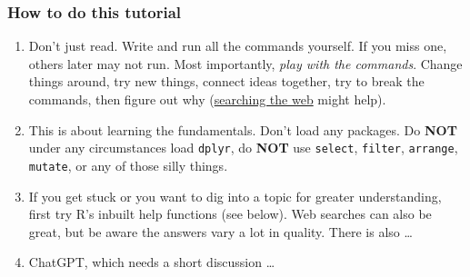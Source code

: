 \documentclass[
]{article}
\providecommand{\tightlist}{%
  \setlength{\itemsep}{0pt}\setlength{\parskip}{0pt}}
\begin{document}
\subsubsection{How to do this tutorial}\label{how-to-do-this-tutorial}

\begin{enumerate}
\def\labelenumi{\arabic{enumi})}
\tightlist
\item
  Don't just read. Write and run all the commands yourself. If you miss
  one, others later may not run. Most importantly, \emph{play with the
  commands}. Change things around, try new things, connect ideas
  together, try to break the commands, then figure out why
  (\href{www.duckduckgo.com}{searching the web} might help).
\item
  This is about learning the fundamentals. Don't load any packages. Do
  \textbf{NOT} under any circumstances load \texttt{dplyr}, do
  \textbf{NOT} use \texttt{select}, \texttt{filter}, \texttt{arrange},
  \texttt{mutate}, or any of those silly things.
\item
  If you get stuck or you want to dig into a topic for greater
  understanding, first try R's inbuilt help functions (see below). Web
  searches can also be great, but be aware the answers vary a lot in
  quality. There is also \ldots{}
\item
  ChatGPT, which needs a short discussion \ldots{}
\end{enumerate}
\end{document}
